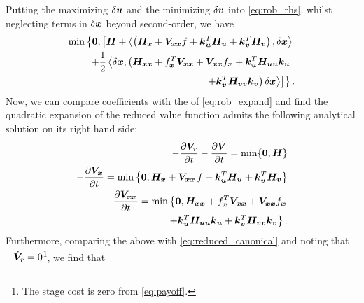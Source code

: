 Putting the maximizing $\delta \bm{u}$ and the minimizing $\delta \bm{v}$ into \eqref{eq:rob_rhs}, whilst neglecting terms in $\delta \bm{x}$ beyond second-order, we have
%
\begin{align}
	\begin{split} 
		\min \left\{\bm{0},  
		 \left[\hamfunc + \left\langle \left(\hamfunc_{\state}  + \valuefunc_{\state \state} f + \gain_{\control}^T \hamfunc_{\control} + \gain_{\disturb}^T \hamfunc_{\disturb}\right), \delta \state \right\rangle  \right. \right. \\ \left. \left.
		+    \dfrac{1}{2} \left\langle \delta \state, \left(\hamfunc_{\state \state} + f_{\state}^T \valuefunc_{\state \state}  + \valuefunc_{\state \state} f_{\state}  + \gain_{\control}^T \hamfunc_{\control  \control}  \gain_{\control} 
		 \right.\right. \right. \right.  \\ \left. \left. \left. \left. 
		+ \gain_{\disturb}^T \hamfunc_{\disturb  \disturb}  \gain_{\disturb} \right) \delta \state \right\rangle \right] \right\}. 
	\end{split}
	\label{eq:rob_ham_analytical}
\end{align}
%
Now, we can compare coefficients with the \lhs of \eqref{eq:rob_expand} and find the quadratic expansion of the reduced value function admits the following analytical solution on its right hand side:
%
\begin{subequations}
	\begin{align}
		-\dfrac{\partial \bm{V}_r}{\partial t} - \dfrac{\partial \tilde{\bm{V}}}{\partial t} = \min\{\bm{0}, \bm{H}\} \\
		-\dfrac{\partial \bm{V}_{\bm{x}}}{\partial t} = \min \left\{\bm{0}, \bm{H}_{\bm{x}} + \bm{V}_{\bm{x}\bm{x}} \, f + \bm{k}_{\bm{u}}^T \bm{H}_{\bm{u} } + \bm{k}_{\bm{v}}^T \bm{H}_{\bm{v}} \right\} \\
		-  \dfrac{\partial \bm{V}_{\bm{x} \bm{x}}}{\partial t} = \min \left\{\bm{0}, \bm{H}_{\bm{x} \bm{x}} + f_{\bm{x}}^T\bm{V}_{\bm{x}\bm{x}} + \bm{V}_{\bm{x}\bm{x}} f_{\bm{x}}  \right. \nonumber \\
		\left.
		+ \bm{k}_{\bm{u}}^T \bm{H}_{\bm{u}  \bm{u}}  \bm{k}_{\bm{u}} +  \bm{k}_{\bm{v}}^T \bm{H}_{\bm{v}  \bm{v}}  \bm{k}_{\bm{v}} \right\}.
	\end{align}
\end{subequations}
%
%
Furthermore, comparing the above with \eqref{eq:reduced_canonical} and noting that $-\dot{\bm{V}}_r = 0$\footnote{The stage cost is zero from \eqref{eq:payoff}.}, we find that 
